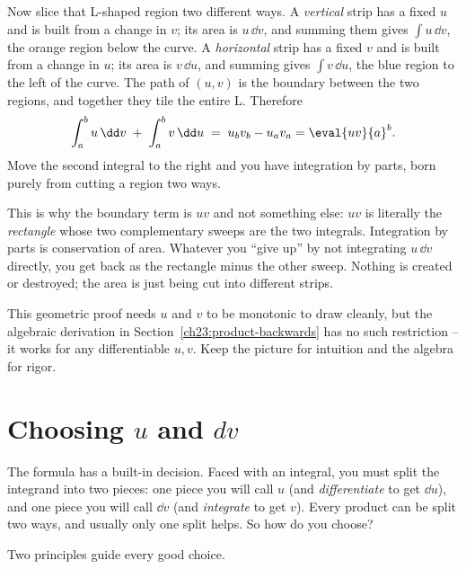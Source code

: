 Now slice that L-shaped region two different ways. A \emph{vertical} strip has a
fixed $u$ and is built from a change in $v$; its area is $u\,\dd v$, and summing
them gives $\int u\,\dd v$, the orange region below the curve. A \emph{horizontal}
strip has a fixed $v$ and is built from a change in $u$; its area is $v\,\dd u$,
and summing gives $\int v\,\dd u$, the blue region to the left of the curve. The
path of $(u,v)$ is the boundary between the two regions, and together they tile
the entire L. Therefore
\[
\int_a^b u\,\dd v \;+\; \int_a^b v\,\dd u \;=\; u_b v_b - u_a v_a
= \eval{uv}{a}^{b}.
\]
Move the second integral to the right and you have integration by parts, born
purely from cutting a region two ways.

\begin{intuitionbox}
This is why the boundary term is $uv$ and not something else: $uv$ is literally
the \emph{rectangle} whose two complementary sweeps are the two integrals.
Integration by parts is conservation of area. Whatever you ``give up'' by not
integrating $u\,\dd v$ directly, you get back as the rectangle minus the other
sweep. Nothing is created or destroyed; the area is just being cut into different
strips.
\end{intuitionbox}

This geometric proof needs $u$ and $v$ to be monotonic to draw cleanly, but the
algebraic derivation in Section~\ref{ch23:product-backwards} has no such
restriction -- it works for any differentiable $u,v$. Keep the picture for
intuition and the algebra for rigor.

\section{Choosing \texorpdfstring{$u$}{u} and \texorpdfstring{$dv$}{dv}}
\label{ch23:choosing}

The formula has a built-in decision. Faced with an integral, you must split the
integrand into two pieces: one piece you will call $u$ (and \emph{differentiate}
to get $\dd u$), and one piece you will call $\dd v$ (and \emph{integrate} to get
$v$). Every product can be split two ways, and usually only one split helps. So
how do you choose?

Two principles guide every good choice.

